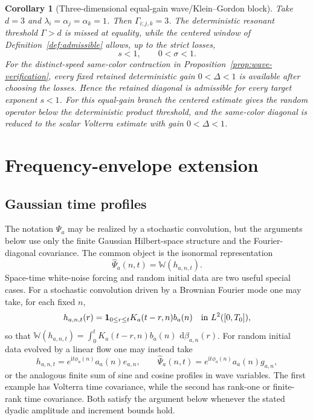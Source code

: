 \documentclass[11pt,reqno]{amsart}
\numberwithin{equation}{section}
\theoremstyle{plain}
\newtheorem{corollary}[theorem]{Corollary}
\theoremstyle{definition}
\newcommand{\dd}{\,\mathrm d}
\newcommand{\ii}{\mathrm i}
\newcommand{\one}{\mathbf 1}
\newcommand{\wh}{\widehat}
\newcommand{\isoW}{\mathbb W}
\begin{document}
\begin{corollary}[Three-dimensional equal-gain wave/Klein--Gordon block]\label{cor:three-d-wave}
Take \(d=3\) and \(\lambda_i=\alpha_j=\alpha_k=1\).  Then \(\Gamma_{i;j,k}=3\).  The deterministic resonant threshold \(\Gamma>d\) is missed at equality, while the centered window of Definition~\ref{def:admissible} allows, up to the strict losses,
\[
        s<1,
        \qquad
        0<\sigma<1 .
\]
For the distinct-speed same-color contraction in Proposition~\ref{prop:wave-verification}, every fixed retained deterministic gain \(0<\Delta<1\) is available after choosing the losses.  Hence the retained diagonal is admissible for every target exponent \(s<1\).  For this equal-gain branch the centered estimate gives the random operator below the deterministic product threshold, and the same-color diagonal is reduced to the scalar Volterra estimate with gain \(0<\Delta<1\).
\end{corollary}


\appendix

\section{Frequency-envelope extension}\label{subsec:envelope-variant}

\subsection{Gaussian time profiles}
The notation \(\Psi_a\) may be realized by a stochastic convolution, but the arguments below use only the finite Gaussian Hilbert-space structure and the Fourier-diagonal covariance.  The common object is the isonormal representation
\[
        \wh\Psi_a(n,t)=\isoW(h_{a,n,t}).
\]
Space-time white-noise forcing and random initial data are two useful special cases.  For a stochastic convolution driven by a Brownian Fourier mode one may take, for each fixed \(n\),
\[
        h_{a,n,t}(r)=\one_{0\le r\le t}K_a(t-r,n)b_a(n)
        \quad\hbox{in }L^2([0,T_0]),
\]
so that \(\isoW(h_{a,n,t})=\int_0^tK_a(t-r,n)b_a(n)\,\dd\beta_{a,n}(r)\).  For random initial data evolved by a linear flow one may instead take
\[
        h_{a,n,t}=e^{\ii t\phi_a(n)}a_a(n)e_{a,n},
        \qquad
        \wh\Psi_a(n,t)=e^{\ii t\phi_a(n)}a_a(n)g_{a,n},
\]
or the analogous finite sum of sine and cosine profiles in wave variables.  The first example has Volterra time covariance, while the second has rank-one or finite-rank time covariance.  Both satisfy the argument below whenever the stated dyadic amplitude and increment bounds hold.
\end{document}
